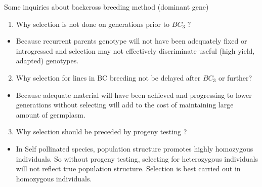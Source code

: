 \documentclass[11pt,ignorenonframetext,aspectratio=169]{beamer}
\providecommand{\tightlist}{%
  \setlength{\itemsep}{0pt}\setlength{\parskip}{0pt}}
\begin{document}
\begin{frame}{Some inquiries about backcross breeding method (dominant
gene)}
\protect\hypertarget{some-inquiries-about-backcross-breeding-method-dominant-gene}{}
\begin{enumerate}
\tightlist
\item
  Why selection is not done on generations prior to \(BC_3\) ?
\end{enumerate}

\begin{itemize}
\tightlist
\item
  Because recurrent parents genotype will not have been adequately fixed
  or introgressed and selection may not effectively discriminate useful
  (high yield, adapted) genotypes.
\end{itemize}

\begin{enumerate}
\setcounter{enumi}{1}
\tightlist
\item
  Why selection for lines in BC breeding not be delayed after \(BC_3\)
  or further?
\end{enumerate}

\begin{itemize}
\tightlist
\item
  Because adequate material will have been achieved and progressing to
  lower generations without selecting will add to the cost of
  maintaining large amount of germplasm.
\end{itemize}

\begin{enumerate}
\setcounter{enumi}{2}
\tightlist
\item
  Why selection should be preceded by progeny testing ?
\end{enumerate}

\begin{itemize}
\tightlist
\item
  In Self pollinated species, population structure promotes highly
  homozygous individuals. So without progeny testing, selecting for
  heterozygous individuals will not reflect true population structure.
  Selection is best carried out in homozygous individuals.
\end{itemize}
\end{frame}
\end{document}
